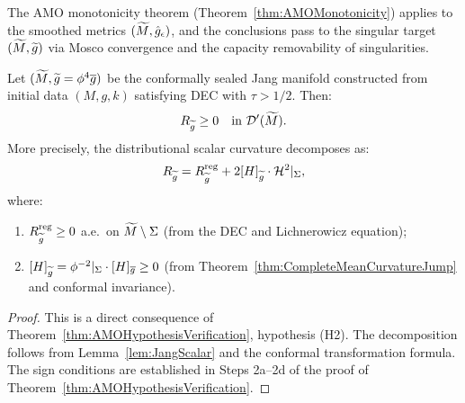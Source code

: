\begin{corollary}\label{cor:AMOApplies}
The AMO monotonicity theorem (Theorem~\ref{thm:AMOMonotonicity}) applies to the smoothed metrics $(\widetilde{M}, \hat{g}_\epsilon)$, and the conclusions pass to the singular target $(\widetilde{M}, \widetilde{g})$ via Mosco convergence and the capacity removability of singularities.
\end{corollary}

\begin{corollary}\label{cor:SealedNNSC}
Let $(\widetilde{M}, \widetilde{g} = \phi^4 \overline{g})$ be the conformally sealed Jang manifold constructed from initial data $(M, g, k)$ satisfying DEC with $\tau > 1/2$. Then:
\begin{equation}
    R_{\widetilde{g}} \ge 0 \quad \text{in } \mathcal{D}'(\widetilde{M}).
\end{equation}
More precisely, the distributional scalar curvature decomposes as:
\begin{equation}
    R_{\widetilde{g}} = R_{\widetilde{g}}^{\mathrm{reg}} + 2[H]_{\widetilde{g}} \cdot \mathcal{H}^2|_\Sigma,
\end{equation}
where:
\begin{enumerate}
    \item $R_{\widetilde{g}}^{\mathrm{reg}} \ge 0$ a.e.\ on $\widetilde{M} \setminus \Sigma$ (from the DEC and Lichnerowicz equation);
    \item $[H]_{\widetilde{g}} = \phi^{-2}|_\Sigma \cdot [H]_{\overline{g}} \ge 0$ (from Theorem~\ref{thm:CompleteMeanCurvatureJump} and conformal invariance).
\end{enumerate}
\end{corollary}

\begin{proof}
This is a direct consequence of Theorem~\ref{thm:AMOHypothesisVerification}, hypothesis (H2). The decomposition follows from Lemma~\ref{lem:JangScalar} and the conformal transformation formula. The sign conditions are established in Steps 2a--2d of the proof of Theorem~\ref{thm:AMOHypothesisVerification}.
\end{proof}

